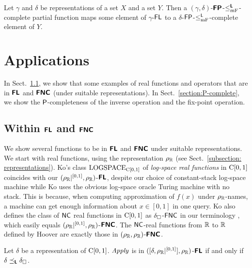 \documentclass[envcountsect,envcountsame,orivec,oribibl]{llncs}
\begin{document}
\begin{lemma}
 \label{lemma:p-comp-maps-l-to-p-comp}
 Let $\gamma$ and $\delta$ be representations of a set $X$ and a set $Y$.
 Then a $(\gamma, \delta)$-$\text{\bfseries \sffamily \upshape FP}$-$\leq _{\mathrm{mF}} ^{\text{\bfseries \sffamily \upshape L}}$-complete partial function 
 maps some element of $\gamma$-$\mathsf{FL}$ 
 to a $\delta$-$\mathsf{FP}$-$\leq _{\mathrm{mF}}^{\mathsf{L}}$-complete element of $Y$.
\end{lemma}

\section{Applications}
\label{section:applications}

In Sect.~\ref{section:function}, 
we show that some examples of real functions and operators 
that are in $\text{\bfseries \sffamily \upshape FL}$ and $\text{\bfseries \sffamily \upshape FNC}$ (under suitable representations). 
In Sect.~\ref{section:P-complete}, we show the $\mathsf{P}$-completeness of 
the inverse operation and the fix-point operation.

\subsection{Within $\text{\bfseries \sffamily \upshape FL}$ and $\text{\bfseries \sffamily \upshape FNC}$}
\label{section:function}

We show several functions to be 
in $\text{\bfseries \sffamily \upshape FL}$ and $\text{\bfseries \sffamily \upshape FNC}$
under suitable representations. 
We start with real functions, 
using the representation $\rho _\mathbb R$
(see Sect.~\ref{subsection: representations}). 
Ko's class $\mathrm{LOGSPACE}_{\mathrm C[0,1]}$ of
\emph{log-space real functions} in $\mathrm C[0,1]$ 
\cite{ko1991complexity} 
coincides with our $(\rho _\mathbb R|^{[0,1]}, \rho _\mathbb R)$-$\text{\bfseries \sffamily \upshape FL}$, 
despite our choice of constant-stack log-space machine 
while Ko uses the obvious log-space oracle Turing machine 
with no stack.
This is because, 
when computing approximation of $f(x)$ under $\rho _\mathbb R$-names, 
a machine can get enough information about $x \in [0,1]$ in one query.
Ko also defines the class of $\mathsf{NC}$ real functions in $\mathrm C[0,1]$
as $\delta _\square$-$\mathsf{FNC}$ in our terminology 
\cite{ko1991complexity},
which easily equals $(\rho _\mathbb R|^{[0,1]}, \rho _\mathbb R)$-$\text{\bfseries \sffamily \upshape FNC}$.
The $\mathsf{NC}$-real functions from $\mathbb R$ to $\mathbb R$ defined by Hoover \cite{hoover1991real}
are exactly those in $(\rho _\mathbb R, \rho _\mathbb R)$-$\text{\bfseries \sffamily \upshape FNC}$.

\begin{theorem}
 \label{theorem:apply-is-L-computable}
 Let $\delta$ be a representation of $\mathrm C[0, 1]$.
 $\mathit{Apply}$ is in $([\delta, \rho _\mathbb R|^{[0,1]}], \rho _\mathbb R)$-$\text{\bfseries \sffamily \upshape FL}$ if
 and only if $\delta \preceq_{\text{\bfseries \sffamily \upshape L}} \delta _\square$.
\end{theorem}
\end{document}
